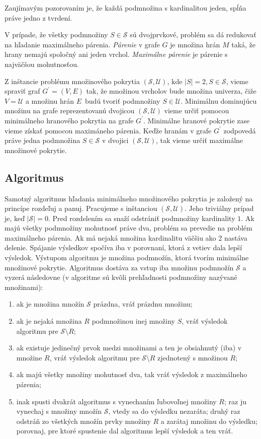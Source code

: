 Zaujímavým pozorovaním je, že každá podmnožina s kardinalitou jeden, spĺňa 
práve jedno z tvrdení.

V prípade, že všetky podmnožiny $S \in \mathcal{S}$ sú dvojprvkové, problém 
sa dá redukovať na hľadanie maximálneho párenia. \emph{Párenie} v grafe $G$ 
je množina hrán $M$ taká, že hrany nemajú spoločný ani jeden vrchol. 
\emph{Maximálne párenie} je párenie s najväčšou mohutnosťou.

Z inštancie problému množinového pokrytia $(\mathcal{S}, \mathcal{U})$, kde 
$|S| = 2, S \in \mathcal{S}$, vieme spraviť graf $G^\prime = (V, E)$ tak, 
že množinou vrcholov bude množina univerza, čiže $V = \mathcal{U}$ a množinu 
hrán $E$ budú tvoriť podmnožiny $S \in \mathcal{U}$. Minimálnu dominujúcu 
množinu na grafe reprezentovanú dvojicou $(\mathcal{S}, \mathcal{U})$ vieme 
určiť pomocou minimálneho hranového pokrytia na grafe $G^\prime$. 
Minimálne hranové pokrytie zase vieme získať pomocou maximáneho párenia. 
Keďže hranám v grafe $G^\prime$ zodpovedá práve jedna podmnožina 
$S \in \mathcal{S}$ v dvojici $(\mathcal{S}, \mathcal{U})$, tak vieme určiť 
maximálne množinové pokrytie.

\subsection{Algoritmus}

Samotný algoritmus hľadania minimálneho množinového pokrytia je založený na 
princípe rozdeľuj a panuj. Pracujeme s inštanciou $(\mathcal{S}, \mathcal{U})$. 
Jeho triviálny prípad je, keď $|\mathcal{S}| = 0$. Pred rozdelením sa snaží 
odstrániť podmnožiny kardinality $1$.  Ak majú všetky podmnožiny mohutnosť 
práve dva, problém sa prevedie na problém maximálneho párenia. Ak má nejaká 
množina kardinalitu väčšiu ako 2 nastáva delenie. Spájanie výsledkov spočíva 
iba v porovnaní, ktorá z vetiev dala lepší výsledok. Výstupom algoritmu je 
množina podmnožín, ktorá tvorím minimálne množinové pokrytie. Algoritmus 
dostáva za vstup iba množinu podmnožín $\mathcal{S}$ a vyzerá následovne 
(v algoritme sú kvôli prehľadnosti podmnožiny nazývané množinami):

\begin{enumerate}
	\item ak je množina množín $\mathcal{S}$ prázdna, vráť prázdnu množinu;
	\item ak je nejaká množina $R$ podmnožinou inej množiny $S$, vráť výsledok 
		algoritmu pre $\mathcal{S} \setminus R$;
	\item ak existuje jedinečný prvok medzi množinami a ten je obsiahnutý (iba) 
		v množine $R$, vráť výsledok algoritmu pre $\mathcal{S} \setminus R$ 
		zjednotený s množinou $R$;
	\item ak majú všetky množiny mohutnosť dva, tak vráť výsledok z maximálneho 
		párenia;
	\item inak spusti dvakrát algoritmus s vynechaním ľubovoľnej množiny $R$; 
		raz ju vynechaj s množiny množín $\mathcal{S}$, vtedy sa do výsledku 
		nezaráta; druhý raz odstráň zo všetkých množín prvky množiny $R$ a 
		zarátaj množinu do výsledku; porovnaj, pre ktoré spustenie dal 
		algoritmus lepší výsledok a ten vráť.
\end{enumerate}

